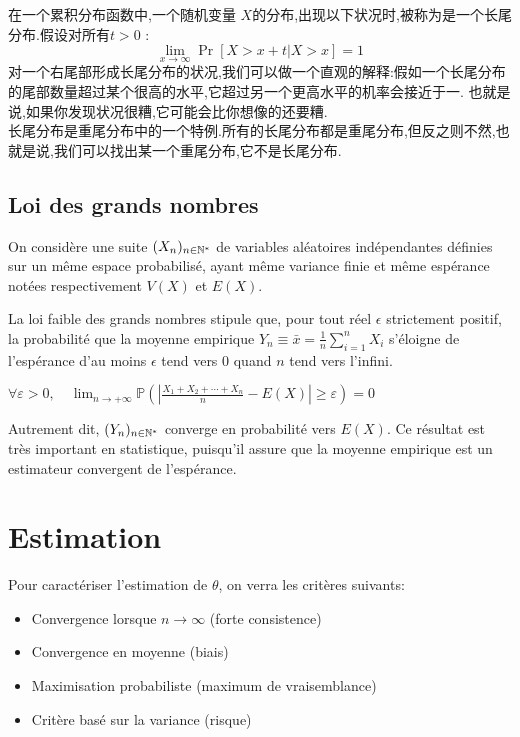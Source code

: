 \documentclass{article}
\begin{document}
在一个累积分布函数中,一个随机变量 $X$的分布,出现以下状况时,被称为是一个长尾分布.假设对所有$t > 0$ :
$$ \lim_{x \to \infty} \Pr[X>x+t|X>x] =1$$
对一个右尾部形成长尾分布的状况,我们可以做一个直观的解释:假如一个长尾分布的尾部数量超过某个很高的水平,它超过另一个更高水平的机率会接近于一.
也就是说,如果你发现状况很糟,它可能会比你想像的还要糟.\\
长尾分布是重尾分布中的一个特例.所有的长尾分布都是重尾分布,但反之则不然,也就是说,我们可以找出某一个重尾分布,它不是长尾分布.

\subsection{Loi des grands nombres}
On consid\`ere une suite $(X_n)_{n\in\mathbb{N}^*}$ de variables al\'eatoires ind\'ependantes d\'efinies sur un m\^eme espace probabilis\'e,
ayant m\^eme variance finie et m\^eme esp\'erance not\'ees respectivement $V(X)$ et $E(X)$.

La loi faible des grands nombres stipule que, pour tout r\'eel $\epsilon$ strictement positif, la probabilit\'e que la moyenne empirique
$Y_n \equiv \bar x= \frac{1}{n} \sum_{i=1}^{n} X_i$ s'\'eloigne de l'esp\'erance d'au moins $\epsilon$ tend vers $0$ quand $n$ tend vers l'infini.

\begin{theorem}
$\forall\varepsilon>0,\quad \lim_{n \to +\infty} \mathbb{P}\left(\left|\frac{X_1+X_2+\cdots+X_n}{n} -E(X)\right| \geqslant \varepsilon\right) = 0$
\end{theorem}

Autrement dit, $(Y_n)_{n\in\mathbb{N}^*}$ converge en probabilit\'e vers $E(X)$. Ce r\'esultat est tr\`es important en statistique,
puisqu'il assure que la moyenne empirique est un estimateur convergent de l'esp\'erance.

\section{Estimation}
Pour caract\'eriser l'estimation de $\theta$, on verra les crit\`eres suivants:
\begin{itemize}
\item Convergence lorsque $n \to \infty$ (forte consistence)
\item Convergence en moyenne (biais)
\item Maximisation probabiliste (maximum de vraisemblance)
\item Crit\`ere bas\'e sur la variance (risque)
\end{itemize}
\end{document}
